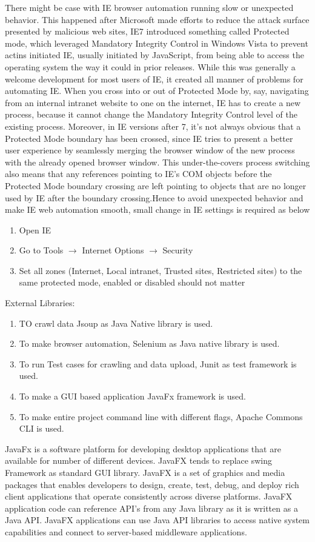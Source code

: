 \documentclass[12pt]{report}
\begin{document}
There might be case with IE browser automation running slow or unexpected behavior. This happened after Microsoft made efforts to reduce the attack surface presented by malicious web sites, IE7 introduced something called Protected mode, which leveraged Mandatory Integrity Control in Windows Vista to prevent actins initiated IE, usually initiated by JavaScript, from being able to access the operating system the way it could in prior releases. While this was generally a welcome development for most users of IE, it created all manner of problems for automating IE.
When you cross into or out of Protected Mode by, say, navigating from an internal intranet website to one on the internet, IE has to create a new process, because it cannot change the Mandatory Integrity Control level of the existing process. Moreover, in IE versions after 7, it's not always obvious that a Protected Mode boundary has been crossed, since IE tries to present a better user experience by seamlessly merging the browser window of the new process with the already opened browser window. This under-the-covers process switching also means that any references pointing to IE's COM objects before the Protected Mode boundary crossing are left pointing to objects that are no longer used by IE after the boundary crossing.Hence to avoid unexpected behavior and make IE web automation smooth, small change in IE settings is required as below
\begin{enumerate} [label=(\alph*)]
\item Open IE
\item Go to Tools $\rightarrow$ {Internet Options} $\rightarrow$ {Security}
\item Set all zones (Internet, Local intranet, Trusted sites, Restricted sites) to the same protected mode, enabled or disabled should not matter
\end{enumerate}
External Libraries:
\begin{enumerate} [label=(\alph*)]
\item TO crawl data Jsoup as Java Native library is used.
\item To make browser automation, Selenium as Java native library is used.
\item To run Test cases for crawling and data upload, Junit as test framework is used. 
\item To make a GUI based application JavaFx framework is used.
\item To make entire project command line with different flags, Apache Commons CLI is used. 
\end{enumerate}
JavaFx is a software platform for developing desktop applications that are available for number of different devices. JavaFX tends to replace swing Framework as standard GUI library. JavaFX is a set of graphics and media packages that enables developers to design, create, test, debug, and deploy rich client applications that operate consistently across diverse platforms. JavaFX application code can reference API’s from any Java library as it is written as a Java API. JavaFX applications can use Java API libraries to access native system capabilities and connect to server-based middleware applications.
\end{document}
